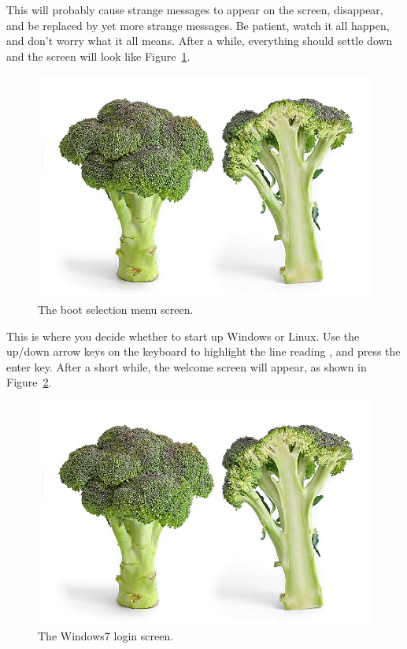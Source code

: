 This will probably cause strange messages to appear on the screen,
disappear, and be replaced by yet more strange messages. Be patient,
watch it all happen, and don't worry what it all means. After a while,
everything should settle down and the screen will look like
Figure~\ref{figure:welc-grub}.

\begin{figure}
\centerline{\includegraphics[width=15cm]{images/broccoli.jpg}}
\caption{The boot selection menu screen.}
\label{figure:welc-grub}
\end{figure}

This is where you decide whether to start up Windows or Linux. Use the
up/down arrow keys on the keyboard to highlight the line
reading \splunge, and press the enter key. After a short while, the
welcome screen will appear, as shown in Figure~\ref{figure:welc-win}.

\begin{figure}
\centerline{\includegraphics[width=15cm]{images/broccoli.jpg}}
\caption{The Windows7 login screen.}
\label{figure:welc-win}
\end{figure}

